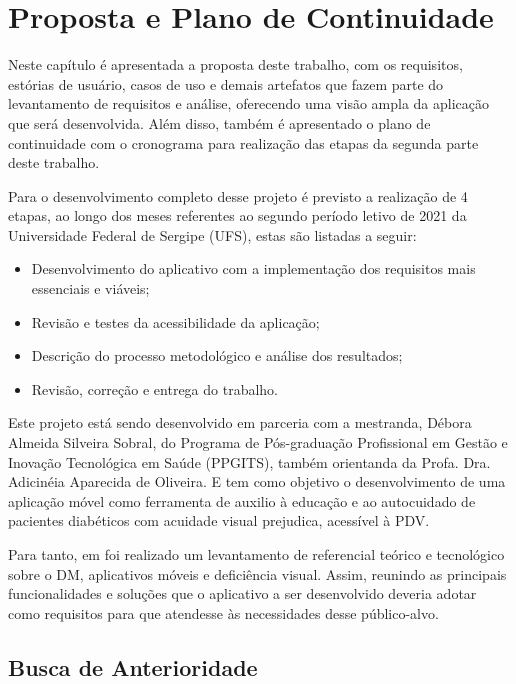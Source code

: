 \chapter{Proposta e Plano de Continuidade}

Neste capítulo é apresentada a proposta deste trabalho, com os requisitos, estórias de usuário, casos de uso e demais artefatos
que fazem parte do levantamento de requisitos e análise, oferecendo uma visão ampla da aplicação que será desenvolvida.
Além disso, também é apresentado o plano de continuidade com o cronograma para realização das etapas da segunda parte deste
trabalho.

Para o desenvolvimento completo desse projeto é previsto a realização de 4 etapas, ao longo dos meses referentes ao segundo
período letivo de 2021 da Universidade Federal de Sergipe (UFS), estas são listadas a seguir:
\begin{itemize}
    \item Desenvolvimento do aplicativo com a implementação dos requisitos mais essenciais e viáveis;
    \item Revisão e testes da acessibilidade da aplicação;
    \item Descrição do processo metodológico e análise dos resultados;
    \item Revisão, correção e entrega do trabalho.
\end{itemize}

Este projeto está sendo desenvolvido em parceria com a mestranda, Débora Almeida Silveira Sobral, do
Programa de Pós-graduação Profissional em Gestão e Inovação Tecnológica em Saúde (PPGITS), também orientanda da Profa.
Dra. Adicinéia Aparecida de Oliveira. E tem como objetivo
o desenvolvimento de uma aplicação móvel como ferramenta de auxilio à educação e ao autocuidado de pacientes diabéticos
com acuidade visual prejudica, acessível à PDV\@.

Para tanto, em  foi realizado um levantamento de referencial teórico e tecnológico sobre o DM,
aplicativos móveis e deficiência visual. Assim, reunindo as principais funcionalidades e soluções que o aplicativo a ser
desenvolvido deveria adotar como requisitos para que atendesse às necessidades desse público-alvo.

\newpage

\section{Busca de Anterioridade}


